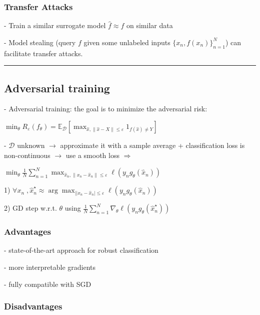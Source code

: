 \subsubsection{Transfer Attacks}

- Train a similar surrogate model ${\hat{f}}\approx f$ on similar data

- Model stealing (query $f$ given some unlabeled inputs $\{x_{n},f(x_{n})\}_{n=1}^{N}$) can facilitate transfer attacks.


\vspace{4pt}
\hrule
\vspace{4pt}
\subsection{Adversarial training}

- Adversarial training: the goal is to minimize the adversarial risk:

$\operatorname*{min}_{\theta}R_{\varepsilon}(f_{\theta})=\mathbb{E}_{\mathcal{D}}\left[\operatorname*{max}_{\hat{x},\|\hat{x}-X\|\leq\varepsilon}1_{f(\hat{x})\neq Y}\right]$

- $\mathcal{D}$ unknown $\rightarrow$ approximate it with a sample average + classification loss is non-continuous $\rightarrow$ use a smooth loss $\Rightarrow$

$\operatorname*{min}_{\theta}{\frac{1}{N}}\sum_{n=1}^{N} \operatorname*{max}_{\hat{x}_{n},\|x_{n}-\hat{x}_{n}\|\leq\varepsilon}{\ell}(y_{n}g_{\theta}(\hat{x}_{n}))$

1) $\forall x_n\;, \hat{x}_{n}^{\star}\approx\arg\operatorname*{max}_{||x_{n}-\hat{x}_{n}|\leq\varepsilon}\ell(y_{n}g_{\theta}(\hat{x}_{n}))$

2) GD step w.r.t. $\theta$ using $\frac{1}{N}\sum_{n=1}^{N}\nabla_{\theta}{\ell}(y_{n}g_{\theta}({\hat{x}}_{n}^{\star}))$

\subsubsection{Advantages}

- state-of-the-art approach for robust classification

- more interpretable gradients

- fully compatible with SGD

\subsubsection{Disadvantages}

